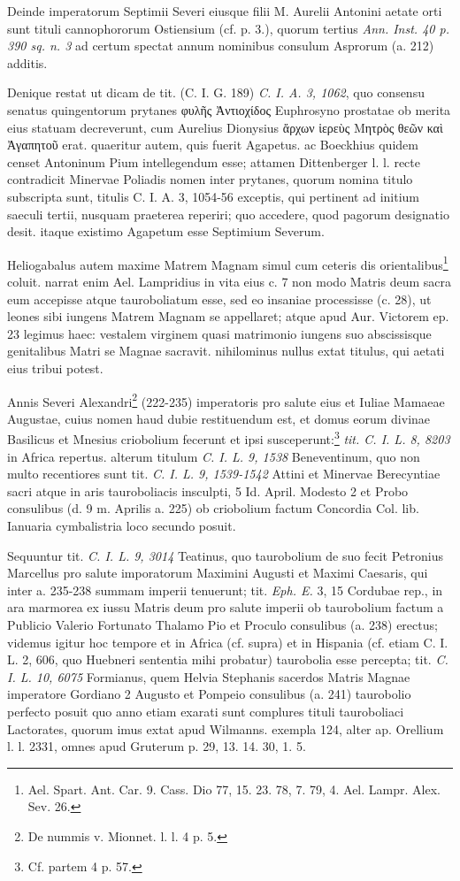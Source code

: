\documentclass[a4paper, 11pt, oneside, polutonikogreek, german, twocolumn]{article}
\begin{document}
Deinde imperatorum Septimii Severi eiusque filii M. Aurelii Antonini aetate orti sunt tituli cannophororum Ostiensium (cf. p. 3.), quorum tertius \emph{Ann. Inst. 40 p. 390 sq. n. 3} ad certum spectat annum nominibus consulum Asprorum (a. 212) additis.

Denique restat ut dicam de tit. (C. I. G. 189) \emph{C. I. A. 3, 1062}, quo consensu senatus quingentorum prytanes φυλῆς Ἀντιοχίδος Euphrosyno prostatae ob merita eius statuam decreverunt, cum Aurelius Dionysius ἄρχων ἱερεὺς Μητρὸς θεῶν καὶ Ἀγαπητοῦ erat. quaeritur autem, quis fuerit Agapetus. ac Boeckhius quidem censet Antoninum Pium intellegendum esse; attamen Dittenberger l. l. recte contradicit Minervae Poliadis nomen inter prytanes, quorum nomina titulo subscripta sunt, titulis C. I. A. 3, 1054-56 exceptis, qui pertinent ad initium saeculi tertii, nusquam praeterea reperiri; quo accedere, quod pagorum designatio desit. itaque existimo Agapetum esse Septimium Severum.

Heliogabalus autem maxime Matrem Magnam simul cum ceteris dis orientalibus\footnote{Ael. Spart. Ant. Car. 9. Cass. Dio 77, 15. 23. 78, 7. 79, 4. Ael. Lampr. Alex. Sev. 26.} coluit. narrat enim Ael. Lampridius in vita eius c. 7 non modo Matris deum sacra eum accepisse atque tauroboliatum esse, sed eo insaniae processisse (c. 28), ut leones sibi iungens Matrem Magnam se appellaret; atque apud Aur. Victorem ep. 23 legimus haec: vestalem virginem quasi matrimonio iungens suo abscissisque genitalibus Matri se Magnae sacravit. nihilominus nullus extat titulus, qui aetati eius tribui potest.

Annis Severi Alexandri\footnote{De nummis v. Mionnet. l. l. 4 p. 5.} (222-235) imperatoris pro salute eius et Iuliae Mamaeae Augustae, cuius nomen haud dubie restituendum est, et domus eorum divinae Basilicus et Mnesius criobolium fecerunt et ipsi susceperunt:\footnote{Cf. partem 4 p. 57.} \emph{tit. C. I. L. 8, 8203} in Africa repertus. alterum titulum \emph{C. I. L. 9, 1538} Beneventinum, quo non multo recentiores sunt tit. \emph{C. I. L. 9, 1539-1542} Attini et Minervae Berecyntiae sacri atque in aris tauroboliacis insculpti, 5 Id. April. Modesto 2 et Probo consulibus (d. 9 m. Aprilis a. 225) ob criobolium factum Concordia Col. lib. Ianuaria cymbalistria loco secundo posuit.

Sequuntur tit. \emph{C. I. L. 9, 3014} Teatinus, quo taurobolium de suo fecit Petronius Marcellus pro salute imporatorum Maximini Augusti et Maximi Caesaris, qui inter a. 235-238 summam imperii tenuerunt; tit. \emph{Eph. E.} 3, 15 Cordubae rep., in ara marmorea ex iussu Matris deum pro salute imperii ob taurobolium factum a Publicio Valerio Fortunato Thalamo Pio et Proculo consulibus (a. 238) erectus; videmus igitur hoc tempore et in Africa (cf. supra) et in Hispania (cf. etiam C. I. L. 2, 606, quo Huebneri sententia mihi probatur) taurobolia esse percepta; tit. \emph{C. I. L. 10, 6075} Formianus, quem Helvia Stephanis sacerdos Matris Magnae imperatore Gordiano 2 Augusto et Pompeio consulibus (a. 241) taurobolio perfecto posuit quo anno etiam exarati sunt complures tituli tauroboliaci Lactorates, quorum imus extat apud Wilmanns. exempla 124, alter ap. Orellium l. l. 2331, omnes apud Gruterum p. 29, 13. 14. 30, 1. 5.
\end{document}
